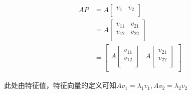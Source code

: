 \documentclass[12pt, a4paper, oneside]{ctexbook}
\begin{document}
\begin{align}
    AP
    &=A
    \left[
        \begin{matrix}
            v_1 & v_2 \\
        \end{matrix}
    \right] 
    \nonumber
    \\
    &=A
    \left[
        \begin{matrix}
            v_{11} & v_{21} \\
            v_{12} & v_{22} \\
        \end{matrix}
    \right] 
    \nonumber
    \\
    &=
    \left[
        \begin{matrix}
            A
            \left[
                \begin{matrix}
                    v_{11} \\ v_{12} \\
                \end{matrix}
            \right] &
            A
            \left[
                \begin{matrix}
                    v_{21} \\ v_{22} \\
                \end{matrix}
            \right] \\
        \end{matrix}
    \right]
    \nonumber
\end{align}

此处由特征值，特征向量的定义可知$Av_1=\lambda_1 v_1,Av_2=\lambda_2 v_2$
\end{document}
